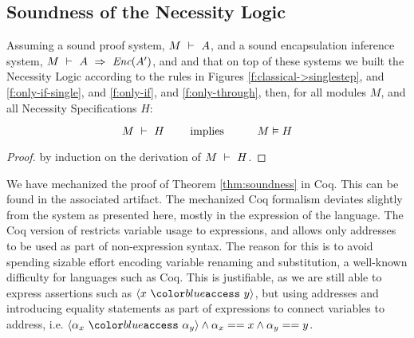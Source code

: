 \subsection{Soundness of the Necessity Logic}

\label{s:soundness}

\begin{theorem}[Soundness]
\label{thm:soundness}
Assuming a sound \SpecO proof system, $M\ \vdash\ A$, and
a sound encapsulation inference system, $M\ \vdash\ A\ \Rightarrow\ \textit{Enc}(A')$,
 and  and that on top of these systems we built
 the Necessity Logic according to the rules in Figures  \ref{f:classical->singlestep},  and \ref{f:only-if-single}, and \ref{f:only-if},  and \ref{f:only-through},   then, for    all modules $M$, and all Necessity Specifications  $H$:
 
 $$\proves{M}{H}\ \ \ \ \ \ \ \mbox{implies}\ \ \ \ \ \  \ \ \ \satisfies{M}{H}$$
\end{theorem}

\begin{proof}
by induction on the derivation of $M\ \vdash\ H$.
\end{proof}
We have mechanized the proof of Theorem \ref{thm:soundness} in Coq. This can be found in the associated artifact. 
The mechanized Coq formalism deviates slightly from the system as
presented here,  mostly in the expression of the 
\SpecO language. The Coq version of \SpecO restricts variable usage to expressions, and allows only addresses to 
be used as part of non-expression syntax. The reason for this is to avoid spending sizable effort encoding variable
renaming and substitution, a well-known difficulty for languages such as Coq. This is justifiable, as we are still 
able to express assertions such as $\access{x}{y}$, but using addresses and introducing equality statements as part of expressions to connect
variables to address, i.e. $\access{\alpha_x}{\alpha_y} \wedge \alpha_x == x \wedge \alpha_y == y$.


